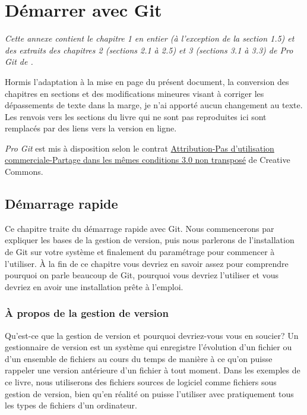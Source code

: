 \chapter{Démarrer avec Git}
\label{chap:git}

\begingroup
{}
\raggedbottom

{%
  \itshape%
  Cette annexe contient le chapitre 1 en entier (à l'exception de la
  section 1.5) et des extraits des chapitres 2 (sections 2.1 à 2.5) et
  3 (sections 3.1 à 3.3) de \emph{Pro Git} de \citet{ProGit:2e:2014}.

  Hormis l'adaptation à la mise en page du présent document, la
  conversion des chapitres en sections et des modifications mineures
  visant à corriger les dépassements de texte dans la marge, je n'ai
  apporté aucun changement au texte. Les renvois vers les sections du
  livre qui ne sont pas reproduites ici sont remplacés par des liens
  vers la version en ligne.

  \emph{Pro Git} est mis à disposition selon le contrat
  \href{https://creativecommons.org/licenses/by-nc-sa/3.0/deed.fr}{%
    Attribution-Pas d’utilisation commerciale-Partage dans les mêmes
    conditions 3.0 non transposé} de Creative Commons. %
}

\section{Démarrage rapide}
\label{sec:git:getting_started}

Ce chapitre traite du démarrage rapide avec Git.
Nous commencerons par expliquer les bases de la gestion de version, puis nous parlerons de l'installation de Git sur votre système et finalement du paramétrage pour commencer à l'utiliser.
À la fin de ce chapitre vous devriez en savoir assez pour comprendre pourquoi on parle beaucoup de Git, pourquoi vous devriez l'utiliser et vous devriez en avoir une installation prête à l'emploi.

\subsection{À propos de la gestion de version}

Qu'est-ce que la gestion de version et pourquoi devriez-vous vous en soucier?
Un gestionnaire de version est un système qui enregistre l'évolution d'un fichier ou d'un ensemble de fichiers au cours du temps de manière à ce qu'on puisse rappeler une version antérieure d'un fichier à tout moment.
Dans les exemples de ce livre, nous utiliserons des fichiers sources de logiciel comme fichiers sous gestion de version, bien qu'en réalité on puisse l'utiliser avec pratiquement tous les types de fichiers d'un ordinateur.

